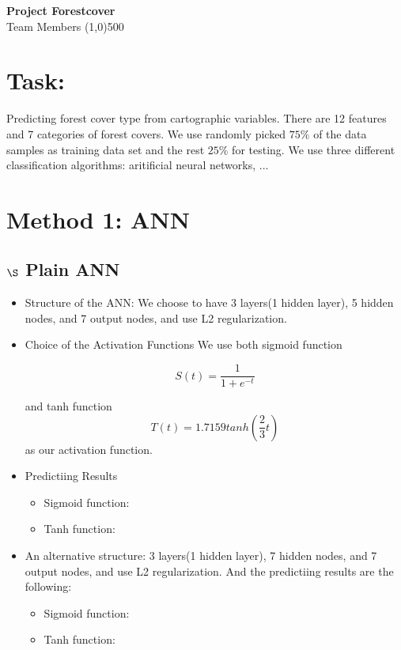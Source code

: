 \documentclass[11pt]{article}  %
\begin{document}
\begingroup
    \fontsize{18pt}{25pt}\selectfont

    \begin{center}
    \textbf{Project Forestcover}\\
\begingroup
\fontsize{10pt}{212pt}\selectfont
Team Members
\endgroup
\line(1,0){500}
\end{center}
\endgroup

\section*{Task:}
Predicting forest cover type from cartographic variables. There are 12 features and 7 categories of forest covers. We use randomly picked $75\%$ of the data samples as training data set and the rest $25\%$ for testing. We use three different classification algorithms: aritificial neural networks, ...
\section*{Method 1: ANN}


\subsection*{$\S$ Plain ANN}

\begin{itemize}
\item Structure of the ANN:
We choose to have 3 layers(1 hidden layer), 5 hidden nodes, and 7 output nodes, and use L2 regularization.
\item Choice of the Activation Functions
We use both sigmoid function 

\begin{equation}
S(t) = \frac{1}{1 + e^{-t}}
\end{equation}

and tanh function 
\begin{equation}
T(t) = 1.7159tanh(\frac{2}{3}t)
\end{equation}
as our activation function.
\item Predictiing Results
\begin{itemize}

\item Sigmoid function:

\item Tanh function: 

\end{itemize}

\item An alternative structure: 3 layers(1 hidden layer), 7 hidden nodes, and 7 output nodes, and use L2 regularization. And the predictiing results are the following:
\begin{itemize}

\item Sigmoid function:

\item Tanh function: 
\end{itemize}
\end{itemize}
\end{document}
